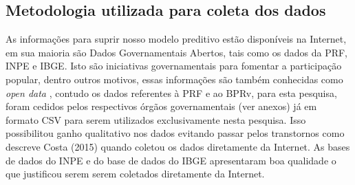 \subsection{ Metodologia utilizada para coleta dos dados}\label{intro:metodologia}


As informações para suprir nosso modelo preditivo estão disponíveis na Internet, em sua maioria são Dados Governamentais Abertos, tais como os dados
da PRF, INPE e IBGE. Isto são iniciativas governamentais para fomentar a participação popular, dentro outros motivos, essas informações são também 
conhecidas como \textit{open data} \cite{DadosGoverno}, contudo os dados referentes à PRF e ao BPRv, para esta pesquisa, foram cedidos pelos respectivos 
órgãos governamentais (ver anexos) já em formato CSV para serem utilizados exclusivamente nesta pesquisa. Isso possibilitou ganho qualitativo nos dados evitando 
passar pelos transtornos como descreve Costa (2015) quando coletou os dados diretamente da Internet.\cite{Costa2015} 
As bases de dados do INPE e do base de dados do IBGE apresentaram boa qualidade o que justificou serem serem coletados diretamente da Internet.


